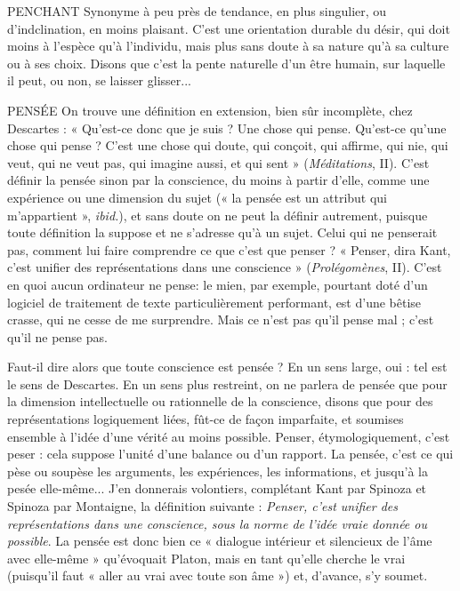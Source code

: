 PENCHANT Synonyme à peu près de tendance, en plus singulier, ou d’indclination,
en moins plaisant. C’est une orientation durable du
désir, qui doit moins à l'espèce qu’à l'individu, mais plus sans doute à sa nature
qu’à sa culture ou à ses choix. Disons que c’est la pente naturelle d’un être
humain, sur laquelle il peut, ou non, se laisser glisser...

PENSÉE On trouve une définition en extension, bien sûr incomplète, chez
Descartes : « Qu'est-ce donc que je suis ? Une chose qui pense.
Qu'est-ce qu’une chose qui pense ? C’est une chose qui doute, qui conçoit, qui
affirme, qui nie, qui veut, qui ne veut pas, qui imagine aussi, et qui sent »
({\it Méditations}, II). C’est définir la pensée sinon par la conscience, du moins à
partir d’elle, comme une expérience ou une dimension du sujet (« la pensée est
un attribut qui m’appartient », {\it ibid.}), et sans doute on ne peut la définir autrement,
puisque toute définition la suppose et ne s'adresse qu’à un sujet. Celui
qui ne penserait pas, comment lui faire comprendre ce que c’est que penser ?
« Penser, dira Kant, c’est unifier des représentations dans une conscience »
({\it Prolégomènes}, II). C’est en quoi aucun ordinateur ne pense: le mien, par
exemple, pourtant doté d’un logiciel de traitement de texte particulièrement
performant, est d’une bêtise crasse, qui ne cesse de me surprendre. Mais ce n’est
pas qu’il pense mal ; c’est qu’il ne pense pas.

Faut-il dire alors que toute conscience est pensée ? En un sens large, oui :
tel est le sens de Descartes. En un sens plus restreint, on ne parlera de pensée
que pour la dimension intellectuelle ou rationnelle de la conscience, disons
que pour des représentations logiquement liées, fût-ce de façon imparfaite, et
soumises ensemble à l’idée d’une vérité au moins possible. Penser, étymologiquement,
c'est peser : cela suppose l’unité d’une balance ou d’un rapport.
La pensée, c’est ce qui pèse ou soupèse les arguments, les expériences, les
informations, et jusqu’à la pesée elle-même... J'en donnerais volontiers,
complétant Kant par Spinoza et Spinoza par Montaigne, la définition
suivante : {\it Penser, c'est unifier des représentations dans une conscience, sous la
norme de l'idée vraie donnée ou possible}. La pensée est donc bien ce « dialogue
intérieur et silencieux de l’âme avec elle-même » qu’évoquait Platon, mais en
tant qu’elle cherche le vrai (puisqu'il faut « aller au vrai avec toute son âme »)
et, d'avance, s’y soumet.

